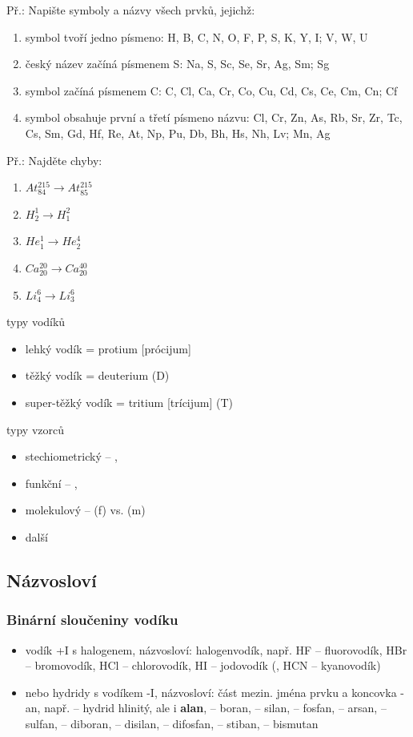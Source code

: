 \documentclass{article}
\begin{document}
Př.: Napište symboly a názvy všech prvků, jejichž:
  \begin{enumerate}
    \item symbol tvoří jedno písmeno: H, B, C, N, O, F, P, S, K, Y, I; V, W, U
    \item český název začíná písmenem S: Na, S, Sc, Se, Sr, Ag, Sm; Sg
    \item symbol začíná písmenem C: C, Cl, Ca, Cr, Co, Cu, Cd, Cs, Ce, Cm, Cn; Cf
    \item symbol obsahuje první a třetí písmeno názvu: Cl, Cr, Zn, As, Rb, Sr, Zr, Tc, Cs, Sm, Gd, Hf, Re, At, Np, Pu, Db, Bh, Hs, Nh, Lv; Mn, Ag
  \end{enumerate}


Př.: Najděte chyby:
  \begin{enumerate}
    \item $At^215_84 \rightarrow At^215_85$
    \item $H^1_2 \rightarrow H^2_1$
    \item $He^1_1 \rightarrow He^4_2$
    \item $Ca^20_20 \rightarrow Ca^40_20$
    \item $Li^6_4 \rightarrow Li^6_3$
  \end{enumerate}

typy vodíků
\begin{itemize}
  \item lehký vodík = protium [prócijum]
  \item těžký vodík = deuterium (D)
  \item super-těžký vodík = tritium [trícijum] (T)
\end{itemize}

typy vzorců
\begin{itemize}
  \item stechiometrický -- , 
  \item funkční -- , 
  \item molekulový -- (f) vs. (m)
  \item další
\end{itemize}

\subsection{Názvosloví}

\subsubsection{Binární sloučeniny vodíku}
\begin{itemize}
  \item vodík +I s halogenem, názvosloví: halogenvodík, např. HF -- fluorovodík, HBr -- bromovodík, HCl -- chlorovodík, HI -- jodovodík (, HCN -- kyanovodík)
  \item nebo hydridy s vodíkem -I, názvosloví: část mezin. jména prvku a koncovka -an, např.  -- hydrid hlinitý, ale i \textbf{alan},  -- boran,  -- silan,  -- fosfan,  -- arsan,  -- sulfan,  -- diboran,  -- disilan,  -- difosfan,  -- stiban,  -- bismutan
\end{itemize}
\end{document}
